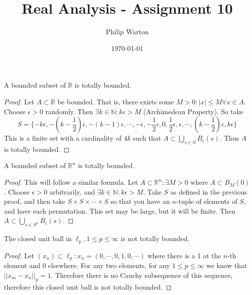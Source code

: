 \documentclass{article}
\theoremstyle{definition}
\begin{document}
\title{Real Analysis - Assignment 10}
\author{Philip Warton}
\date{\today}
\maketitle
\begin{mdframed}
    A bounded subset of $\mathbb{R}$ is totally bounded.
\end{mdframed}
\begin{proof}
    Let $A \subset \mathbb{R}$ be bounded. That is, there exists some $M > 0 : |x| \leqslant M \forall x \in A$.
    Choose $\epsilon > 0$ randomly. Then $\exists k \in \mathbb{N} : k\epsilon > M$ (Archimedean Property). So take
    \[
        S = \{-k\epsilon, -(k - \frac{1}{2})\epsilon, -(k - 1)\epsilon, \cdots, -\epsilon, -\frac{1}{2} \epsilon, 0, \frac{1}{2} \epsilon, \epsilon, \cdots, (k - \frac{1}{2})\epsilon, k\epsilon\}  
    \]
    This is a finite set with a cardinality of $4k$ such that $A \subset \bigcup_{s \in S} B_\epsilon(s)$. Thus $A$ is totally bounded.
\end{proof}
\begin{mdframed}
    A bounded subset of $\mathbb{R}^n$ is totally bounded.
\end{mdframed}
\begin{proof}
    This will follow a similar formula. Let $A \subset \mathbb{R}^n : \exists M > 0 \text{ where } A \subset B_M(0)$.
    Choose $\epsilon > 0$ arbitrarily, and $\exists k \in \mathbb{N} : k\epsilon > M$. Take $S$ as defined in the previous proof,
    and then take $S \times S \times \cdots \times S$ so that you have an $n$-tuple of elements of $S$, and have each permutation.
    This set may be large, but it will be finite. Then $A \subset \bigcup_{s \in S^n} B_\epsilon(s)$.
\end{proof}
\begin{mdframed}
    The closed unit ball in $\ell_p, 1 \leqslant p \leqslant \infty$ is not totally bounded.
\end{mdframed}
\begin{proof}
    Let $(x_n) \subset \ell_p : x_n = (0,\cdots,0,1,0,\cdots)$ where there is a 1 at the $n$-th element and 0 elsewhere.
    For any two elements, for any $1 \leqslant p \leqslant \infty$ we know that $||x_m - x_n||_p = 1$.
    Therefore there is no Cauchy subsequence of this sequence, therefore this closed unit ball is not totally bounded.
\end{proof}
\end{document}
